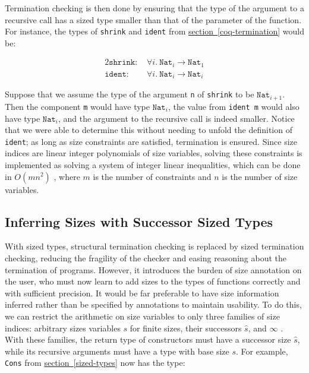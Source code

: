 \documentclass{article}
\begin{document}
Termination checking is then done by ensuring that the type of the argument to a recursive call has a sized type smaller than that of the parameter of the function. For instance, the types of \texttt{shrink} and \texttt{ident} from \hyperlink{shrink}{section~\ref*{coq-termination}} would be:

\begin{alignat*}{2}
    \texttt{shrink: } &\forall i.\ \texttt{Nat}_i \rightarrow \texttt{Nat}_1\\
    \texttt{ident: }  &\forall i.\ \texttt{Nat}_i \rightarrow \texttt{Nat}_i
\end{alignat*}

Suppose that we assume the type of the argument \texttt{n} of \texttt{shrink} to be $\texttt{Nat}_{i+1}$. Then the component \texttt{m} would have type $\texttt{Nat}_i$, the value from \texttt{ident m} would also have type $\texttt{Nat}_i$, and the argument to the recursive call is indeed smaller. Notice that we were able to determine this without needing to unfold the definition of \texttt{ident}; as long as size constraints are satisfied, termination is ensured. Since size indices are linear integer polynomials of size variables, solving these constraints is implemented as solving a system of integer linear inequalities, which can be done in $O(mn^2)$ \cite{omega}, where $m$ is the number of constraints and $n$ is the number of size variables.

\subsection{Inferring Sizes with Successor Sized Types}\label{successor}
With sized types, structural termination checking is replaced by sized termination checking, reducing the fragility of the checker and easing reasoning about the termination of programs. However, it introduces the burden of size annotation on the user, who must now learn to add sizes to the types of functions correctly and with sufficient precision. It would be far preferable to have size information inferred rather than be specified by annotations to maintain usability. To do this, we can restrict the arithmetic on size variables to only three families of size indices: arbitrary sizes variables $s$ for finite sizes, their successors $\hat{s}$, and $\infty$ \cite{f-hat, cic-hat, cic-hat-bar}. With these families, the return type of constructors must have a successor size $\hat{s}$, while its recursive arguments must have a type with base size $s$. For example, \texttt{Cons} from \hyperlink{list}{section~\ref*{sized-types}} now has the type:
\end{document}
